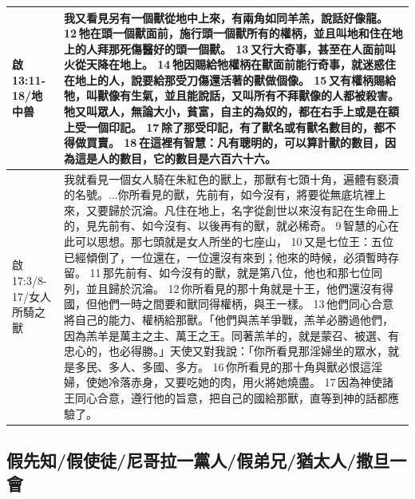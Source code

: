 \begin{table}[H]
\begin{tabular}{p{}|p{}}
啟13:11-18/地中兽&我又看見另有一個獸從地中上來，有兩角如同羊羔，說話好像龍。 12 牠在頭一個獸面前，施行頭一個獸所有的權柄，並且叫地和住在地上的人拜那死傷醫好的頭一個獸。 13 又行大奇事，甚至在人面前叫火從天降在地上。 14 牠因賜給牠權柄在獸面前能行奇事，就迷惑住在地上的人，說要給那受刀傷還活著的獸做個像。 15 又有權柄賜給牠，叫獸像有生氣，並且能說話，又叫所有不拜獸像的人都被殺害。牠又叫眾人，無論大小，貧富，自主的為奴的，都在右手上或是在額上受一個印記。 17 除了那受印記，有了獸名或有獸名數目的，都不得做買賣。 18 在這裡有智慧：凡有聰明的，可以算計獸的數目，因為這是人的數目，它的數目是六百六十六。\\\hline

啟17:3/8-17/女人所騎之獸&我就看見一個女人騎在朱紅色的獸上，那獸有七頭十角，遍體有褻瀆的名號。...你所看見的獸，先前有，如今沒有，將要從無底坑裡上來，又要歸於沉淪。凡住在地上，名字從創世以來沒有記在生命冊上的，見先前有、如今沒有、以後再有的獸，就必稀奇。 9 智慧的心在此可以思想。那七頭就是女人所坐的七座山， 10 又是七位王：五位已經傾倒了，一位還在，一位還沒有來到；他來的時候，必須暫時存留。 11 那先前有、如今沒有的獸，就是第八位，他也和那七位同列，並且歸於沉淪。 12 你所看見的那十角就是十王，他們還沒有得國，但他們一時之間要和獸同得權柄，與王一樣。 13 他們同心合意將自己的能力、權柄給那獸。「他們與羔羊爭戰，羔羊必勝過他們，因為羔羊是萬主之主、萬王之王。同著羔羊的，就是蒙召、被選、有忠心的，也必得勝。」天使又對我說：「你所看見那淫婦坐的眾水，就是多民、多人、多國、多方。 16 你所看見的那十角與獸必恨這淫婦，使她冷落赤身，又要吃她的肉，用火將她燒盡。 17 因為神使諸王同心合意，遵行他的旨意，把自己的國給那獸，直等到神的話都應驗了。\\\hline
  
\end{tabular}
\end{table}










\subsection{假先知/假使徒/尼哥拉一黨人/假弟兄/猶太人/撒旦一會}
